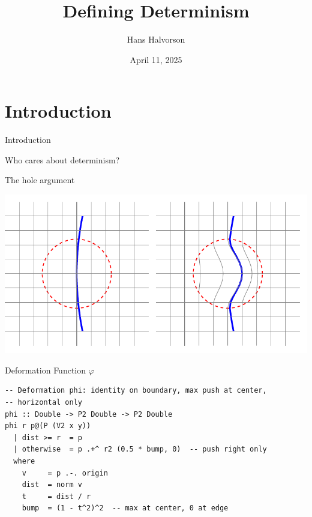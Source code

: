 \documentclass[fleqn]{beamer}
\title{Defining Determinism}
\subtitle{}
\author{Hans Halvorson}
\institute{Princeton University}
\date{April 11, 2025}
\begin{document}
\begin{frame}
  \titlepage
\end{frame}

\section{Introduction}

\begin{frame}{Introduction}


  {\Huge
    Who cares about determinism? }


\end{frame}

\begin{frame}{The hole argument}

  \includegraphics[scale=0.8]{hole.pdf}


\end{frame}

\begin{frame}[fragile]{Deformation Function $\varphi$}
\begin{verbatim}
-- Deformation phi: identity on boundary, max push at center,
-- horizontal only
phi :: Double -> P2 Double -> P2 Double
phi r p@(P (V2 x y))
  | dist >= r  = p
  | otherwise  = p .+^ r2 (0.5 * bump, 0)  -- push right only
  where
    v     = p .-. origin
    dist  = norm v
    t     = dist / r
    bump  = (1 - t^2)^2  -- max at center, 0 at edge
\end{verbatim}
\end{frame}
\end{document}
